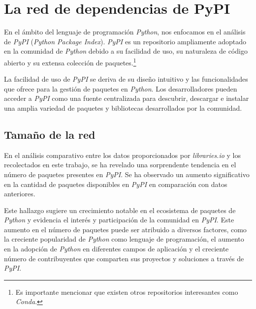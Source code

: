 \newpage

\section{La red de dependencias de PyPI}

En el ámbito del lenguaje de programación \textit{Python}, nos enfocamos en el análisis de \textit{PyPI}
(\textit{Python Package Index}). \textit{PyPI} es un repositorio ampliamente adoptado en la comunidad de
\textit{Python} debido a su facilidad de uso, su naturaleza de código abierto y su extensa colección de
paquetes.\footnote{Es importante mencionar que existen otros repositorios interesantes como \textit{Conda}.}

La facilidad de uso de \textit{PyPI} se deriva de su diseño intuitivo y las funcionalidades que ofrece
para la gestión de paquetes en \textit{Python}. Los desarrolladores pueden acceder a \textit{PyPI} como
una fuente centralizada para descubrir, descargar e instalar una amplia variedad de paquetes y bibliotecas
desarrollados por la comunidad.

\subsection{Tamaño de la red}

En el análisis comparativo entre los datos proporcionados por \textit{libraries.io} y los recolectados en
este trabajo, se ha revelado una sorprendente tendencia en el número de paquetes presentes en \textit{PyPI}.
Se ha observado un aumento significativo en la cantidad de paquetes disponibles en \textit{PyPI} en
comparación con datos anteriores.

Este hallazgo sugiere un crecimiento notable en el ecosistema de paquetes de \textit{Python} y evidencia
el interés y participación de la comunidad en \textit{PyPI}. Este aumento en el número de paquetes puede
ser atribuido a diversos factores, como la creciente popularidad de \textit{Python} como lenguaje de
programación, el aumento en la adopción de \textit{Python} en diferentes campos de aplicación y el
creciente número de contribuyentes que comparten sus proyectos y soluciones a través de \textit{PyPI}.


